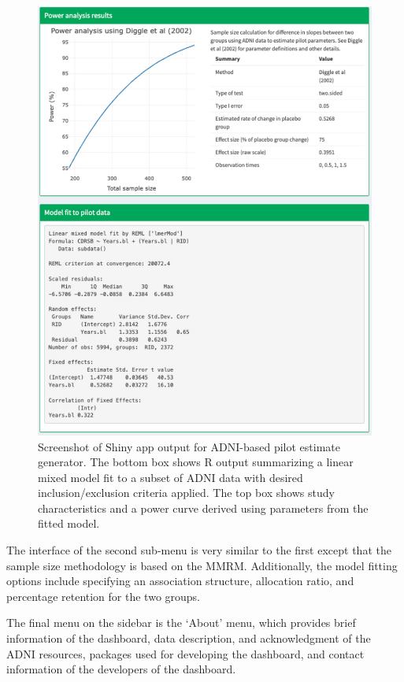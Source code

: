 \begin{figure}[htp!]
	\includegraphics[width=14cm]{Figures/ADNI-mmrm-out3.pdf}
	\caption{Screenshot of Shiny app output for ADNI-based pilot estimate generator. The bottom box shows R output summarizing a linear mixed model fit to a subset of ADNI data with desired inclusion/exclusion criteria applied.
The top box shows study characteristics and a power curve derived using parameters from the fitted model.}\label{ADNIOutput3}
\end{figure}

The interface of the second sub-menu is very similar to the first except that the sample size methodology is based on the MMRM. Additionally, the model fitting options include specifying an association structure, allocation ratio, and percentage retention for the two groups. 

The final menu on the sidebar is the `About' menu, which provides brief information of the dashboard, data description, and acknowledgment of the ADNI resources, packages used for developing the dashboard, and contact information of the developers of the dashboard. 

